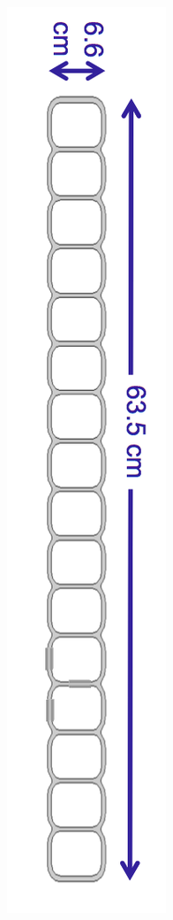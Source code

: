 \begin{figure}
\begin{minipage}{.45\textwidth}
    \includegraphics[height=0.4\textheight]{../../img/baird/det/extru_cross_section.png}
    \label{fig:extrusion}
  \end{minipage}
\end{figure}




